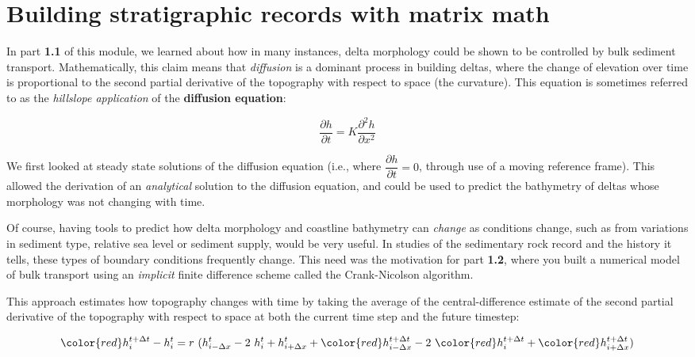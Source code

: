 
\section*{Building stratigraphic records with matrix math}
In part \textbf{1.1} of this module, we learned about how in many instances, delta morphology could be shown to be controlled by bulk sediment transport. Mathematically, this claim means that \emph{diffusion} is a dominant process in building deltas, where the change of elevation over time is proportional to the second partial derivative of the topography with respect to space (the curvature). This equation is sometimes referred to as the \textit{hillslope application} of the \textbf{diffusion equation}:

\begin{equation*}
	\dfrac{\partial h}{\partial t} = K \dfrac{\partial^2 h}{\partial x^2} \label{eq:diff}
    \tag{diffusion equation}
\end{equation*}

\noindent We first looked at steady state solutions of the diffusion equation (i.e., where $\dfrac{\partial h}{\partial t} = 0$, through use of a moving reference frame). This allowed the derivation of an \emph{analytical} solution to the diffusion equation, and could be used to predict the bathymetry of deltas whose morphology was not changing with time.

\vspace{1em}

\noindent Of course, having tools to predict how delta morphology and coastline bathymetry can \emph{change} as conditions change, such as from variations in sediment type, relative sea level or sediment supply, would be very useful. In studies of the sedimentary rock record and the history it tells, these types of boundary conditions frequently change. This need was the motivation for part \textbf{1.2}, where you built a numerical model of bulk transport using an \emph{implicit} finite difference scheme called the Crank-Nicolson algorithm. \\

\vspace{1em}

\noindent This approach estimates how topography changes with time by taking the average of the central-difference estimate of the second partial derivative of the topography with respect to space at both the current time step and the future timestep:

\begin{equation*}
	{\color{red}h_{i}^{t+\Delta t}}
	-
	h_i^t
	=
	r~(h_{i-\Delta x}^{t}
	-
	2~h_{i}^{t}
	+
	h_{i+\Delta x}^{t}
	+
	{\color{red}
	h_{i-\Delta x}^{t+\Delta t}}
	-
	2~{\color{red}h_{i}^{t+\Delta t}}
	+
	{\color{red}h_{i+\Delta x}^{t+\Delta t}})
	\\
\end{equation*}



